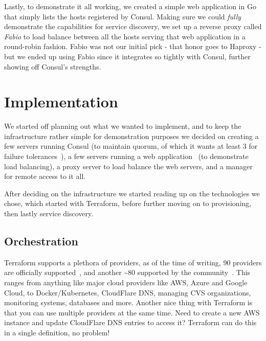        Lastly, to demonstrate it all working, we created a simple web application in Go that simply lists the hosts registered by Consul. Making sure we could \textit{fully} demonstrate the capabilities for service discovery, we set up a reverse proxy called \textit{Fabio} to load balance between all the hosts serving that web application in a round-robin fashion. Fabio was not our initial pick - that honor goes to Haproxy - but we ended up using Fabio since it integrates so tightly with Consul, further showing off Consul's strengths.
    
    \section{Implementation}
        We started off planning out what we wanted to implement, and to keep the infrastructure rather simple for demonstration purposes we decided on creating a few servers running Consul (to maintain quorum, of which it wants at least 3 for failure tolerances~\cite{Consul:Consensus}), a few servers running a web application~\cite{WebApplication} (to demonstrate load balancing), a proxy server to load balance the web servers, and a manager for remote access to it all.
        
        \begin{center}
        \end{center}
        
        After deciding on the infrastructure we started reading up on the technologies we chose, which started with Terraform, before further moving on to provisioning, then lastly service discovery.
    
        \subsection{Orchestration}
            Terraform supports a plethora of providers, as of the time of writing, 90 providers are officially supported~\cite{Terraform:Providers}, and another \textasciitilde80 supported by the community~\cite{Terraform:CommunityProviders}. This ranges from anything like major cloud providers like AWS, Azure and Google Cloud, to Docker/Kubernetes, CloudFlare DNS, managing CVS organizations, monitoring systems, databases and more. Another nice thing with Terraform is that you can use multiple providers at the same time. Need to create a new AWS instance and update CloudFlare DNS entries to access it? Terraform can do this in a single definition, no problem!\\
            
